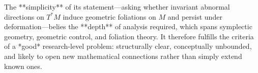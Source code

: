 The **simplicity** of its statement—asking whether invariant abnormal directions on \(T^*M\) induce geometric foliations on \(M\) and persist under deformation—belies the **depth** of analysis required, which spans symplectic geometry, geometric control, and foliation theory. It therefore fulfills the criteria of a *good* research-level problem: structurally clear, conceptually unbounded, and likely to open new mathematical connections rather than simply extend known ones.